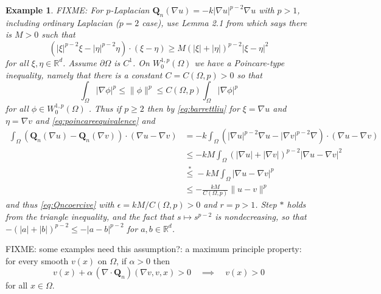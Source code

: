 \documentclass[final,leqno,onefignum,onetabnum]{siamltex1213bueler}
\newtheorem{example}{Example}
\newcommand\bQ{\mathbf{Q}}
\newcommand{\Div}{\nabla\cdot}
\newcommand\eps{\epsilon}
\renewcommand{\grad}{\nabla}
\newcommand\RR{\mathbb{R}}
\begin{document}
\begin{example} FIXME: For $p$-Laplacian $\bQ_n(\grad u) = - k |\grad u|^{p-2} \grad u$ with $p>1$, including ordinary Laplacian ($p=2$ case), use Lemma 2.1 from \cite{BarrettLiu1993} which says there is $M>0$ such that
\begin{equation}
    (|\xi|^{p-2}\xi - |\eta|^{p-2}\eta)\cdot (\xi - \eta) \ge M \left(|\xi|+|\eta|\right)^{p-2} |\xi-\eta|^2  \label{eq:barrettliu}
\end{equation}
for all $\xi,\eta\in\RR^d$.  Assume $\partial \Omega$ is $C^1$.  On $W_0^{1,p}(\Omega)$ we have a Poincare-type inequality, namely  that there is a constant $C = C(\Omega,p)>0$ so that
\begin{equation}
  \int_\Omega |\grad \phi|^p \le \|\phi\|^p \le C(\Omega,p) \int_\Omega |\grad \phi|^p  \label{eq:poincareequivalence}
\end{equation}
for all $\phi\in W_0^{1,p}(\Omega)$ \cite[theorem 5.6.3]{Evans}.  Thus if $p\ge 2$ then by \eqref{eq:barrettliu} for $\xi = \grad u$ and $\eta = \grad v$ and \eqref{eq:poincareequivalence} and
\begin{align*}
\int_\Omega \left(\bQ_n(\grad u) - \bQ_n(\grad v)\right)\cdot (\grad u - \grad v) &= -k  \int_\Omega \left(|\grad u|^{p-2} \grad u - |\grad v|^{p-2} \grad \right)\cdot (\grad u - \grad v) \\
  &\le - k M  \int_\Omega \left(|\grad u| + |\grad v|\right)^{p-2} |\grad u - \grad v|^2 \\
  &\stackrel{\ast}{\le} - k M  \int_\Omega |\grad u - \grad v|^p \\
  &\le - \frac{k M}{C(\Omega,p)} \|u-v\|^p
\end{align*}
and thus \eqref{eq:Qncoercive} with $\eps = kM/C(\Omega,p) > 0$ and $r=p>1$.  Step $\ast$ holds from the triangle inequality, and the fact that $s\mapsto s^{p-2}$ is nondecreasing, so that $-(|a| + |b|)^{p-2} \le - |a-b|^{p-2}$ for $a,b\in\RR^d$.
\end{example}

FIXME: some examples need this assumption?: a maximum principle property: for every smooth $v(x)$ on $\Omega$, if $\alpha>0$ then
\begin{equation}
v(x) + \alpha\, (\Div \bQ_n)(\grad v,v,x) > 0 \quad \implies \quad v(x) > 0 \label{eq:maxprincQn}
\end{equation}
for all $x\in\Omega$.
\end{document}
